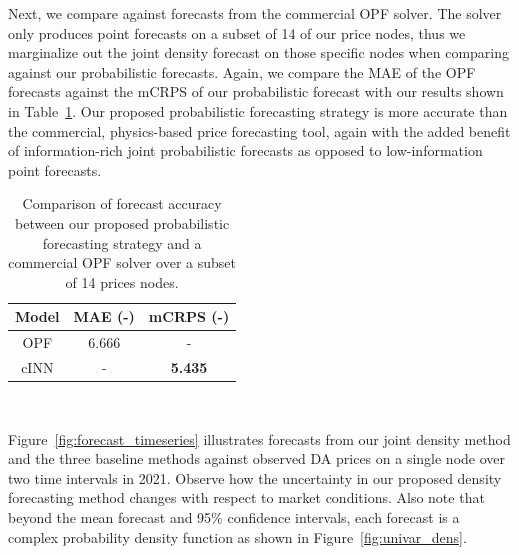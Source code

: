 Next, we compare against forecasts from the commercial OPF solver.
The solver only produces point forecasts on a subset of 14 of our price nodes, thus we marginalize out the joint
density forecast on those specific nodes when comparing against our probabilistic forecasts.
Again, we compare the MAE of the OPF forecasts against the mCRPS of our probabilistic forecast with our results shown
in Table~\ref{tab:opf_comp}.
Our proposed probabilistic forecasting strategy is more accurate than the commercial, physics-based price
forecasting tool, again with the added benefit of information-rich joint probabilistic forecasts as opposed to
low-information point forecasts.

\begin{table}[htb]
    \caption[Comparison of proposed forecasts v.s. commercial optimal powerflow solver]{
        Comparison of forecast accuracy between our proposed probabilistic forecasting strategy and a commercial
        OPF solver over a subset of 14 prices nodes.
    }
    \begin{center}
        \begin{tabular}{||c|c|c||} \hline
        Model & MAE (-) & mCRPS (-)  \\	%
        \hline \hline
        OPF  & 6.666 &           -    \\ \hline
        cINN &   -   & \textbf{5.435} \\ \hline
        \end{tabular}
        \\ \rule{0mm}{5mm}
    \end{center}
    \label{tab:opf_comp}
\end{table}

Figure~\ref{fig:forecast_timeseries} illustrates forecasts from our joint density method and the three baseline methods
against observed DA prices on a single node over two time intervals in 2021.
Observe how the uncertainty in our proposed density forecasting method changes with respect to market conditions.
Also note that beyond the mean forecast and 95\% confidence intervals, each forecast is a complex probability density
function as shown in Figure~\ref{fig:univar_dens}.


